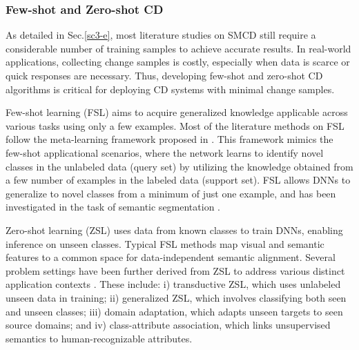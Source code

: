\begin{comment}
  
\subsubsection{From CD to map updating}

The improved accuracy and reliability of CD results have opened opportunities for the continuous updating of LCLU maps. Literature investigations in this domain predominantly employ pixel-level analysis, making them vulnerable to salt-and-pepper noise, and are limited to medium resolution RSIs such as Landsat data \cite{paris2019novel}. Recent advances in CD methodologies allow for direct comparison between LCLU maps and new observations \cite{chen2023land, hong2023cross,chen2024change}, and obtaining high-quality and geometrically regularized CD results at the object level \cite{wu2020geo}. By incorporating these recent advances into LCLU mapping systems in a geometrically consistent manner, we can generate up-to-date maps that accurately capture the dynamic nature of the environment.
  
\end{comment}

\subsubsection{Few-shot and Zero-shot CD}

As detailed in Sec.\ref{sc3-e}, most literature studies on SMCD still require a considerable number of training samples to achieve accurate results. In real-world applications, collecting change samples is costly, especially when data is scarce or quick responses are necessary. Thus, developing few-shot and zero-shot CD algorithms is critical for deploying CD systems with minimal change samples.

Few-shot learning (FSL) aims to acquire generalized knowledge applicable across various tasks using only a few examples. Most of the literature methods on FSL follow the meta-learning framework proposed in \cite{vinyals2016matching}. This framework mimics the few-shot applicational scenarios, where the network learns to identify novel classes in the unlabeled data (query set) by utilizing the knowledge obtained from a few number of examples in the labeled data (support set). FSL allows DNNs to generalize to novel classes from a minimum of just one example, and has been investigated in the task of semantic segmentation \cite{lang2022learning}. 

Zero-shot learning (ZSL) uses data from known classes to train DNNs, enabling inference on unseen classes. Typical FSL methods map visual and semantic features to a common space for data-independent semantic alignment. Several problem settings have been further derived from ZSL to address various distinct application contexts \cite{rahman2022polarity}. These include: i) transductive ZSL, which uses unlabeled unseen data in training; ii) generalized ZSL, which involves classifying both seen and unseen classes; iii) domain adaptation, which adapts unseen targets to seen source domains; and iv) class-attribute association, which links unsupervised semantics to human-recognizable attributes. 

